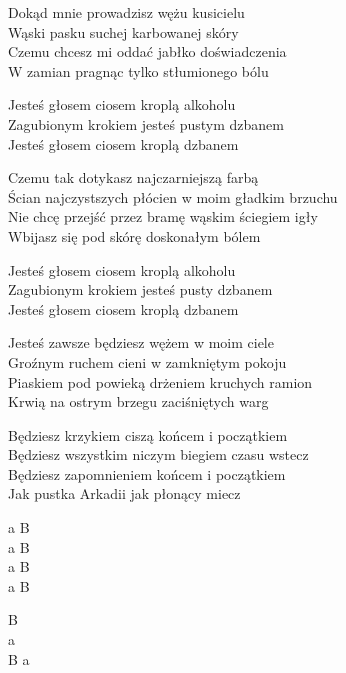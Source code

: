 \begin{text}
    Dokąd mnie prowadzisz wężu kusicielu\\
    Wąski pasku suchej karbowanej skóry\\
    Czemu chcesz mi oddać jabłko doświadczenia\\
    W zamian pragnąc tylko stłumionego bólu

    Jesteś głosem ciosem kroplą alkoholu\\
    Zagubionym krokiem jesteś pustym dzbanem\\
    Jesteś głosem ciosem kroplą dzbanem

    Czemu tak dotykasz najczarniejszą farbą\\
    Ścian najczystszych płócien w moim gładkim brzuchu\\
    Nie chcę przejść przez bramę wąskim ściegiem igły\\
    Wbijasz się pod skórę doskonałym bólem

    Jesteś głosem ciosem kroplą alkoholu\\
    Zagubionym krokiem jesteś pusty dzbanem\\
    Jesteś głosem ciosem kroplą dzbanem

    Jesteś zawsze będziesz wężem w moim ciele\\
    Groźnym ruchem cieni w zamkniętym pokoju\\
    Piaskiem pod powieką drżeniem kruchych ramion\\
    Krwią na ostrym brzegu zaciśniętych warg

    Będziesz krzykiem ciszą końcem i początkiem\\
    Będziesz wszystkim niczym biegiem czasu wstecz\\
    Będziesz zapomnieniem końcem i początkiem\\
    Jak pustka Arkadii jak płonący miecz
\end{text}
\begin{chord}
    a B\\
    a B\\
    a B\\
    a B

    B\\
    a\\
    B a
\end{chord}